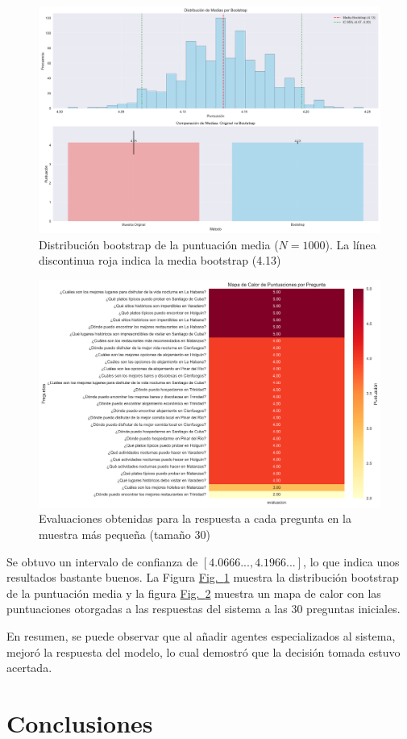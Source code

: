 \documentclass[10pt]{llncs}
\newcommand{\figref}[1]{\hyperref[#1]{Fig.~\ref*{#1}}}
\begin{document}
\begin{figure}[h]
\centering
\includegraphics[width=1\textwidth]{../src/experiments/specialized_agents/bootstrap_distribution_20250614-005640.png}
\caption{Distribución bootstrap de la puntuación media ($N=1000$). La línea discontinua roja indica la media bootstrap (4.13)}
\label{fig:boot_dist_2}
\end{figure}

\begin{figure}[h]
\centering
\includegraphics[width=1\textwidth]{../src/experiments/specialized_agents/quality_heatmap_20250614-005640.png}
\caption{Evaluaciones obtenidas para la respuesta a cada pregunta en la muestra más pequeña (tamaño 30)}
\label{fig:eval_2}
\end{figure}

\begin{remark}
Se obtuvo un intervalo de confianza de $[4.0666...,4.1966...]$, lo que indica unos resultados bastante buenos. 
La Figura {\figref{fig:boot_dist_2}} muestra la distribución bootstrap de la puntuación media y la figura 
{\figref{fig:eval_2}} muestra un mapa de calor con las puntuaciones otorgadas a las respuestas del sistema a las 
30 preguntas iniciales.
\end{remark}

En resumen, se puede observar que al añadir agentes especializados al sistema, mejoró la respuesta del modelo, lo cual demostró 
que la decisión tomada estuvo acertada.

\section{Conclusiones}
\end{document}
